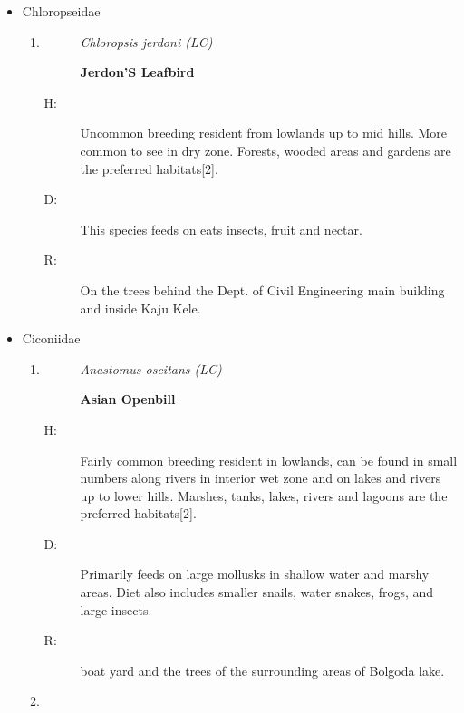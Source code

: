 \begin{itemize}
\begin{enumerate}
%
\end{enumerate}%
\item%
Chloropseidae%
\begin{enumerate}%
\item%
\begin{description}%
\item[]%
\textit{Chloropsis jerdoni (LC)}%
\item[]%
\textbf{Jerdon'S Leafbird}%
\end{description}%
\begin{description}%
\item[H: ]%
Uncommon breeding resident from lowlands up to mid hills. More common to see in dry zone. Forests, wooded areas and gardens are the preferred habitats{[}2{]}.%
\item[D: ]%
This species feeds on eats insects, fruit and nectar. %
\item[R: ]%
On the trees behind the Dept. of Civil Engineering main building and inside Kaju Kele.%
\end{description}%
\end{enumerate}%
\item%
Ciconiidae%
\begin{enumerate}%
\item%
\begin{description}%
\item[]%
\textit{Anastomus oscitans (LC)}%
\item[]%
\textbf{Asian Openbill}%
\end{description}%
\begin{description}%
\item[H: ]%
Fairly common breeding resident in lowlands, can be found in small numbers along rivers in interior wet zone and on lakes and rivers up to lower hills. Marshes, tanks, lakes, rivers and lagoons are the preferred habitats{[}2{]}.%
\item[D: ]%
Primarily feeds on large mollusks in shallow water and marshy areas. Diet also includes smaller snails, water snakes, frogs, and large insects.%
\item[R: ]%
boat yard and the trees of the surrounding areas of Bolgoda lake.%
\end{description}%
\item%

\end{enumerate}
\end{itemize}
